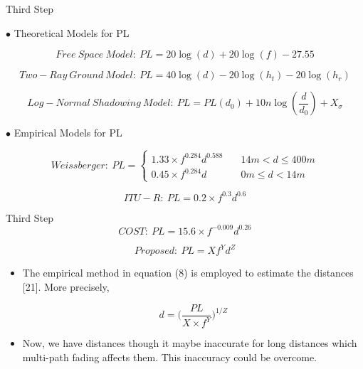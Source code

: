 \documentclass{beamer}
\begin{document}
\begin{frame}[t]{Third Step} %

\footnotesize

$\bullet$ Theoretical Models for PL

\begin{equation}
Free \ Space \ Model: \ PL=20\log (d) +20\log (f) -27.55
\end{equation}


\begin{equation}
Two-Ray \ Ground \ Model: \ PL=40\log (d) -20\log (h_t) -20\log(h_r)
\end{equation}

\begin{equation}
Log-Normal \ Shadowing \ Model: \ PL= PL(d_0)+10n \log(\frac{d}{d_0})+X_{\sigma}
\end{equation}

$\bullet$ Empirical Models for PL

\begin{equation}
Weissberger: \ PL=
        \left\{ \begin{array}{ll} 
    		1.33\times f^{0.284} d^{0.588}     & \quad 14m < d \leq 400m\\
    		0.45\times f^{0.284} d  & \quad 0m \leq d < 14m
        \end{array} \right.
\end{equation}


\begin{equation}
ITU-R: \ PL=0.2 \times f^{0.3}d^{0.6}
\end{equation}

\end{frame}

\begin{frame}[t]{Third Step	} %
\begin{equation}
COST: \ PL=15.6 \times f^{-0.009}d^{0.26}
\end{equation}

\begin{equation}
Proposed: \ PL=X f^{Y}d^{Z}
\end{equation}

\begin{itemize}

\item The empirical method in equation (8) is employed to estimate the distances [21]. More precisely,

\begin{equation}
d=\Big(\frac{PL}{X\times f^Y}\Big)^{1/Z}
\end{equation}

\item Now, we have distances though it maybe inaccurate for long distances which multi-path fading affects them. This inaccuracy could be overcome.

\end{itemize}
\end{frame}
\end{document}

